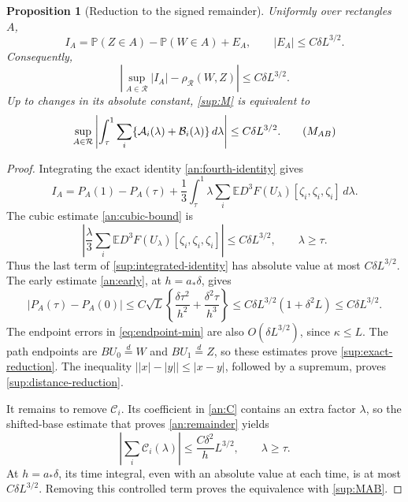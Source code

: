 \documentclass[11pt,a4paper]{article}
\newtheorem{proposition}{Proposition}
\theoremstyle{remark}
\newcommand{\E}{\mathbb E}
\newcommand{\Pp}{\mathbb P}
\newcommand{\cR}{\mathcal R}
\newcommand{\rh}{\rho_{\mathcal R}}
\newcommand{\dd}{\,d}
\begin{document}
\begin{proposition}[Reduction to the signed remainder]
\label{sup:reduction}
Uniformly over rectangles \(A\),
\begin{equation}
 I_A=\Pp(Z\in A)-\Pp(W\in A)+E_A,
 \qquad |E_A|\le C\delta L^{3/2}.
 \label{sup:exact-reduction}
\end{equation}
Consequently,
\begin{equation}
 \left|\sup_{A\in\cR}|I_A|-\rh(W,Z)\right|
 \le C\delta L^{3/2}.
 \label{sup:distance-reduction}
\end{equation}
Up to changes in its absolute constant, \eqref{sup:M} is equivalent to
\begin{equation}
 \sup_{A\in\cR}
 \left|\int_\tau^1\sum_i
       \{\mathcal A_i(\lambda)+\mathcal B_i(\lambda)\}\dd\lambda\right|
 \le C\delta L^{3/2}.
 \tag{$M_{AB}$}\label{sup:MAB}
\end{equation}
\end{proposition}

\begin{proof}
Integrating the exact identity \eqref{an:fourth-identity} gives
\begin{equation}
 I_A=P_A(1)-P_A(\tau)
       +\frac13\int_\tau^1\lambda
          \sum_i\E D^3F(U_\lambda)[\zeta_i,\zeta_i,\zeta_i]
          \dd\lambda.
 \label{sup:integrated-identity}
\end{equation}
The cubic estimate \eqref{an:cubic-bound} is
\[
 \left|\frac\lambda3
       \sum_i\E D^3F(U_\lambda)[\zeta_i,\zeta_i,\zeta_i]\right|
 \le C\delta L^{3/2},\qquad \lambda\ge\tau.
\]
Thus the last term of \eqref{sup:integrated-identity} has absolute
value at most \(C\delta L^{3/2}\). The early estimate
\eqref{an:early}, at \(h=a_*\delta\), gives
\[
 |P_A(\tau)-P_A(0)|
 \le C\sqrt L\left\{\frac{\delta\tau^2}{h^2}
                        +\frac{\delta^2\tau}{h^3}\right\}
 \le C\delta L^{3/2}(1+\delta^2L)
 \le C\delta L^{3/2}.
\]
The endpoint errors in \eqref{eq:endpoint-min} are also
\(O(\delta L^{3/2})\), since \(\kappa\le L\).
The path endpoints are \(BU_0\overset d=W\) and
\(BU_1\overset d=Z\), so these estimates prove
\eqref{sup:exact-reduction}. The inequality
\(\big||x|-|y|\big|\le|x-y|\), followed by a supremum, proves
\eqref{sup:distance-reduction}.

It remains to remove \(\mathcal C_i\). Its coefficient in
\eqref{an:C} contains an extra factor \(\lambda\), so the shifted-base estimate
that proves \eqref{an:remainder} yields
\begin{equation}
 \left|\sum_i\mathcal C_i(\lambda)\right|
 \le\frac{C\delta^2}{h}L^{3/2},\qquad \lambda\ge\tau.
 \label{sup:C-bound}
\end{equation}
At \(h=a_*\delta\), its time integral, even with an absolute value
at each time, is at most \(C\delta L^{3/2}\). Removing this controlled
term proves the equivalence with \eqref{sup:MAB}.
\end{proof}
\end{document}
